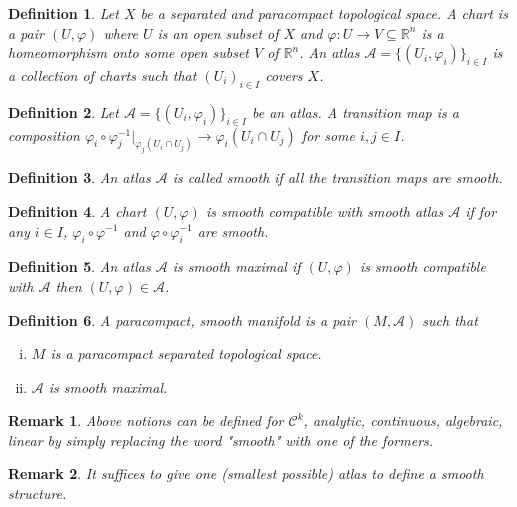 \documentclass[8pt]{article}
\newtheorem{definition}{Definition}[section]
\newtheorem{remark}{Remark}[section]
\newcommand{\R}[0]{\mathbb{R}}
\begin{document}
\begin{definition}
Let $X$ be a separated and paracompact topological space. A chart is a pair $(U,\varphi)$ where $U$ is an open subset of $X$ and $\varphi:U\to V\subseteq\R^n$ is a homeomorphism onto some open subset $V$ of $\R^n$. An atlas $\mathcal{A}=\{(U_i,\varphi_i)\}_{i\in I}$ is a collection of charts such that $(U_i)_{i\in I}$ covers $X$.
\end{definition}

\begin{definition}
Let $\mathcal{A} = \{(U_i,\varphi_i)\}_{i\in I}$ be an atlas. A transition map is a composition $\varphi_i\circ\varphi_j^{-1}|_{\varphi_j(U_i\cap U_j)}\to\varphi_i(U_i\cap U_j)$ for some $i,j\in I$. 
\end{definition}

\begin{definition}
An atlas $\mathcal{A}$ is called smooth if all the transition maps are smooth.
\end{definition}

\begin{definition}
A chart $(U,\varphi)$ is smooth compatible with smooth atlas $\mathcal{A}$ if for any $i\in I$, $\varphi_i\circ\varphi^{-1}$ and $\varphi\circ\varphi_i^{-1}$ are smooth.
\end{definition}

\begin{definition}
An atlas $\mathcal{A}$ is smooth maximal if $(U,\varphi)$ is smooth compatible with $\mathcal{A}$ then $(U,\varphi)\in\mathcal{A}$.
\end{definition}

\begin{definition}
A paracompact, smooth manifold is a pair $(M,\mathcal{A})$ such that 
\begin{enumerate}[i).]
\item $M$ is a paracompact separated topological space.
\item $\mathcal{A}$ is smooth maximal.
\end{enumerate}
\end{definition}

\begin{remark}
Above notions can be defined for $\mathcal{C}^k$, analytic, continuous, algebraic, linear by simply replacing the word "smooth" with one of the formers.
\end{remark}

\begin{remark}
It suffices to give one (smallest possible) atlas to define a smooth structure.
\end{remark}
\end{document}
